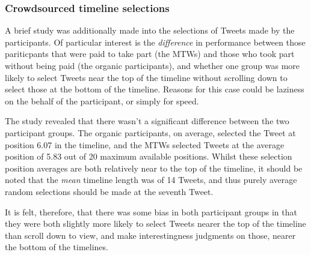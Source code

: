 \subsubsection{Crowdsourced timeline selections}
A brief study was additionally made into the selections of Tweets made by the participants. Of particular interest is the \textit{difference} in performance between those pariticpants that were paid to take part (the MTWs) and those who took part without being paid (the organic participants), and whether one group was more likely to select Tweets near the top of the timeline without scrolling down to select those at the bottom of the timeline. Reasons for this case could be laziness on the behalf of the participant, or simply for speed.

The study revealed that there wasn't a significant difference between the two participant groups. The organic participants, on average, selected the Tweet at position 6.07 in the timeline, and the MTWs selected Tweets at the average position of 5.83 out of 20 maximum available positions.
Whilst these selection position averages are both relatively near to the top of the timeline, it should be noted that the \textit{mean} timeline length was of 14 Tweets, and thus purely average random selections should be made at the seventh Tweet.

It is felt, therefore, that there was some bias in both participant groups in that they were both slightly more likely to select Tweets nearer the top of the timeline than scroll down to view, and make interestingness judgments on those, nearer the bottom of the timelines.

